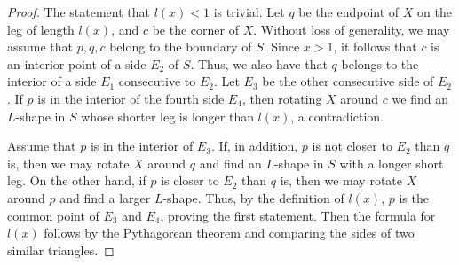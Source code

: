 \documentclass[10pt,a4paper]{amsart}
\begin{document}
\begin{proof}
The statement that $l(x) < 1$ is trivial. Let $q$ be the endpoint of $X$ on the leg of length $l(x)$, and $c$ be the corner of $X$.
Without loss of generality, we may assume that $p,q,c$ belong to the boundary of $S$. Since $x > 1$, it follows that $c$ is an interior point of a side $E_2$ of $S$. Thus, we also have that $q$ belongs to the interior of a side $E_1$ consecutive to $E_2$. Let $E_3$ be the other consecutive side of $E_2$. If $p$ is in the interior of the fourth side $E_4$, then rotating $X$ around $c$ we find an $L$-shape in $S$ whose shorter leg is longer than $l(x)$, a contradiction.

Assume that $p$ is in the interior of $E_3$. If, in addition, $p$ is not closer to $E_2$ than $q$ is, then we may rotate $X$ around $q$ and find an $L$-shape in $S$ with a longer short leg. 
On the other hand, if $p$ is closer to $E_2$ than $q$ is, then we may rotate $X$ around $p$ and find a larger $L$-shape. 
Thus, by the definition of $l(x)$, $p$ is the common point of $E_3$ and $E_4$, proving the first statement. Then the formula for $l(x)$ follows by the Pythagorean theorem and comparing the sides of two similar triangles.
\end{proof}
\end{document}
